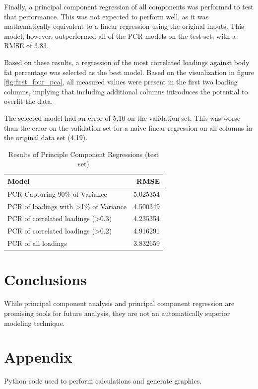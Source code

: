 \documentclass{IEEEtran}
\begin{document}
Finally, a principal component regression of all components was performed to test that performance. This was not expected to perform well, as it was mathematically equivalent to a linear regression using the original inputs. This model, however, outperformed all of the PCR models on the test set, with a RMSE of \num{3.83}.

Based on these results, a regression of the most correlated loadings against body fat percentage was selected as the best model. Based on the visualization in figure \ref{fig:first_four_pca}, all measured values were present in the first two loading columns, implying that including additional columns introduces the potential to overfit the data.

The selected model had an error of \num{5.10} on the validation set. This was worse than the error on the validation set for a naive linear regression on all columns in the original data set (\num{4.19}).

\begin{centering}
\begin{table}
\caption{Results of Principle Component Regressions (test set)\label{tab:results}}
\begin{tabular}{lr}
\toprule
                                Model &      RMSE \\
\midrule
        PCR Capturing 90\% of Variance &  5.025354 \\
 PCR of loadings with \textgreater1\% of Variance &  4.500349 \\
    PCR of correlated loadings (\textgreater0.3) &  4.235354 \\
    PCR of correlated loadings (\textgreater0.2) &  4.916291 \\
                  PCR of all loadings &  3.832659 \\
\bottomrule
\end{tabular}
\end{table}
\end{centering}

\section{Conclusions}

While principal component analysis and principal component regression are promising tools for future analysis, they are not an automatically superior modeling technique. 

\printbibliography

\onecolumn
\section{Appendix}
Python code used to perform calculations and generate graphics.
\lstset{frame=single}

\end{document}
